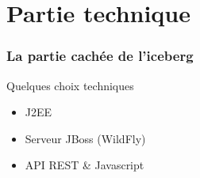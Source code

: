 \documentclass{beamer}
\begin{document}
	\section{Partie technique}
		\begin{frame}
			\frametitle{La partie cachée de l'iceberg}
			\begin{block}{Quelques choix techniques}
				\begin{itemize}
					\item J2EE
					\item Serveur JBoss (WildFly)
					\item API REST \& Javascript
				\end{itemize}
			\end{block}
		\end{frame}		
\end{document}
